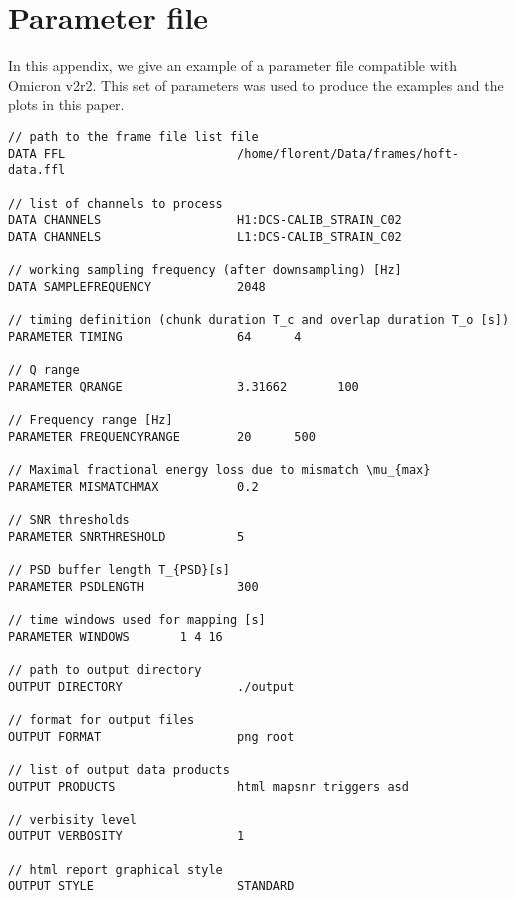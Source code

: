 \appendix
\section{Parameter file}\label{appx:parameters}
In this appendix, we give an example of a parameter file compatible with Omicron v2r2. This set of parameters was used to produce the examples and the plots in this paper.

\begin{verbatim}
// path to the frame file list file
DATA FFL                        /home/florent/Data/frames/hoft-data.ffl

// list of channels to process
DATA CHANNELS                   H1:DCS-CALIB_STRAIN_C02
DATA CHANNELS                   L1:DCS-CALIB_STRAIN_C02

// working sampling frequency (after downsampling) [Hz]
DATA SAMPLEFREQUENCY            2048

// timing definition (chunk duration T_c and overlap duration T_o [s])
PARAMETER TIMING                64      4

// Q range
PARAMETER QRANGE                3.31662       100

// Frequency range [Hz]
PARAMETER FREQUENCYRANGE        20      500

// Maximal fractional energy loss due to mismatch \mu_{max}
PARAMETER MISMATCHMAX           0.2

// SNR thresholds
PARAMETER SNRTHRESHOLD          5

// PSD buffer length T_{PSD}[s]
PARAMETER PSDLENGTH             300

// time windows used for mapping [s]
PARAMETER WINDOWS		1 4 16

// path to output directory
OUTPUT DIRECTORY                ./output

// format for output files
OUTPUT FORMAT                   png root

// list of output data products
OUTPUT PRODUCTS                 html mapsnr triggers asd

// verbisity level
OUTPUT VERBOSITY                1

// html report graphical style
OUTPUT STYLE                    STANDARD
\end{verbatim}
